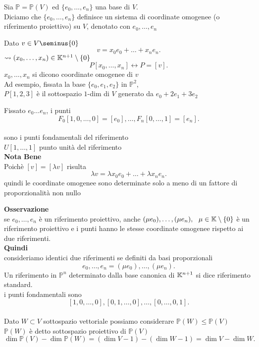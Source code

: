 \documentclass[12px]{article}
\begin{document}
	\begin{defi}
		Sia $\mathbb{P}=\mathbb{P}(V)$ ed $\{e_0,\ldots,e_n\}$ una base di $V$.\\
		Diciamo che $\{e_0,\ldots,e_n\}$ definisce un sistema di coordinate omogenee (o riferimento proiettivo) su $V$, denotato con $e_0,\ldots,e_n$
	\end{defi}
	Dato $v\in V\seminus\{0\}$
	 \[
	v= x_0e_0+\ldots +x_ne_n
	.\] 
	$\leadsto (x_0,\ldots,x_n)\in\mathbb{K}^{n+1}\setminus\{0\}$
	\[
		P[x_0,\ldots,x_n] \leftrightarrow P=[v]
	.\] 
	$x_0,\ldots,x_n$ si dicono coordinate omogenee di $v$
\\
Ad esempio, fissata la base $\{e_0,e_1,e_2\}$ in $\mathbb{P}^2$,\\
	$P[1,2,3]$ è il sottospazio $1 $-dim di $V$ generato da $e_0+2e_1+3e_2$\\
	\begin{nome}
		Fissato $e_0\ldots e_n$, i punti 
		\[
			F_0[1,0,\ldots,0] = [e_0],\ldots,F_n[0,\ldots,1]=[e_n] 
		.\] 
\\sono i punti fondamentali del riferimento\\
		$U[1,\ldots,1]$ punto unità del riferimento\\
		\textbf{Nota Bene}\\
		Poichè $[v] = [ \lambda v]$ risulta
		\[
		\lambda v = \lambda x_0e_0+\ldots+ \lambda x_n e_n
		.\] 
		quindi le coordinate omogenee sono determinate solo a meno di un fattore di proporzionalità non nullo
	\end{nome}
	\textbf{Osservazione}\\
	se $e_0,\ldots ,e_n$ è un riferimento proiettivo, anche  $(\mu e_0),\ldots,(\mu e_n), \ \ \mu\in\mathbb{K}\setminus\{0\}$ è un riferimento proiettivo e i punti hanno le stesse coordinate omogenee rispetto ai due riferimenti.\\
	\textbf{Quindi}\\
	consideriamo identici due riferimenti se definiti da basi proporzionali
	\[
	e_0,\ldots,e_n=(\mu e_0),\ldots,(\mu e_n)
	.\] 
	Un riferimento in $\mathbb{P}^n$ determinato dalla base canonica di $\mathbb{K}^{n+1}$ si dice riferimento standard. \\
	i punti fondamentali sono
	\[
		[1,0,\ldots,0],[0,1,\ldots,0],\ldots,[0,\ldots,0,1]
	.\] 
	\hline \ \\
	Dato $W\subset V$ sottospazio vettoriale possiamo considerare $\mathbb{P}(W)\leq \mathbb{P}(V)$\\
	$\mathbb{P}(W)$ è detto sottospazio proiettivo di $\mathbb{P}(V)$
	\[
		\dim\mathbb{P}(V)-\dim\mathbb{P}(W) = (\dim V-1) -(\dim W -1) = \dim V - \dim W
	.\] 
\end{document}
